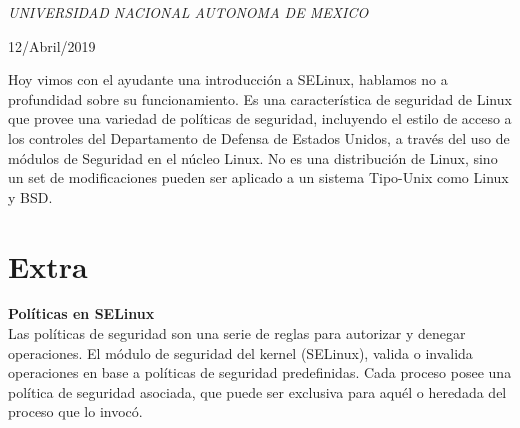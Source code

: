 \documentclass[a4paper, 11pt, oneside]{article}
\begin{document}
\begin{titlepage}
	\textit{UNIVERSIDAD NACIONAL AUTONOMA DE MEXICO} 
	
	\vfill
	
	
	
	
	\vspace{0.3\baselineskip} 
	
	12/Abril/2019 
	
	 

\end{titlepage}
Hoy vimos con el ayudante una introducción a SELinux, hablamos no a profundidad sobre su funcionamiento.
Es una característica de seguridad de Linux que provee una variedad de políticas de seguridad, incluyendo el estilo de acceso a los controles del Departamento de Defensa de Estados Unidos, a través del uso de módulos de Seguridad en el núcleo Linux. No es una distribución de Linux, sino un set de modificaciones pueden ser aplicado a un sistema Tipo-Unix como Linux y BSD.

\section*{Extra}
\textbf{Políticas en SELinux}\\
Las políticas de seguridad son una serie de reglas para autorizar y denegar operaciones. El módulo de seguridad del kernel (SELinux), valida o invalida operaciones en base a políticas de seguridad predefinidas. Cada proceso posee una política de seguridad asociada, que puede ser exclusiva para aquél o heredada del proceso que lo invocó.
\end{document}
